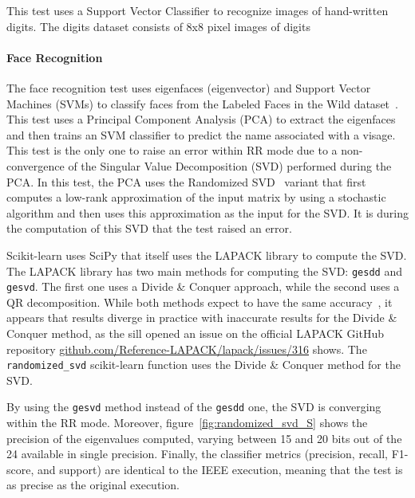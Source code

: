 \documentclass[11pt]{article}
\begin{document}
This test uses a Support Vector Classifier to recognize images of hand-written
digits. The digits dataset consists of 8x8 pixel images of digits


\paragraph{Face Recognition}

The face recognition test uses eigenfaces (eigenvector) and Support Vector Machines (SVMs) to classify faces from the Labeled Faces in the Wild dataset~\cite{LFWTech}. This test uses a Principal Component Analysis (PCA) to extract the eigenfaces and then trains an SVM classifier to predict the name associated with a visage. This test is the only one to raise an error within RR mode due to a non-convergence of the Singular Value Decomposition (SVD) performed during the PCA.
In this test, the PCA uses the Randomized SVD~\cite{halko2011finding} variant that first computes a low-rank approximation of the input matrix by using a stochastic algorithm and then uses this approximation as the input for the SVD. It is during the computation of this SVD that the test raised an error.

Scikit-learn uses SciPy that itself uses the LAPACK library to compute the SVD. The LAPACK library has two main methods for computing the SVD: 
\texttt{gesdd} and \texttt{gesvd}. The first one uses a Divide \& Conquer approach, while the second uses a QR decomposition. While both methods expect to have the same accuracy~\cite{nakatsukasa2013stable}, it appears that results diverge in practice with inaccurate results for the Divide \& Conquer method, as the sill opened an issue on the official LAPACK GitHub repository \href{https://github.com/Reference-LAPACK/lapack/issues/316}{github.com/Reference-LAPACK/lapack/issues/316} shows. The \texttt{randomized\_svd} scikit-learn function uses the Divide \& Conquer method for the SVD. 

By using the \texttt{gesvd} method instead of the \texttt{gesdd} one, the SVD is converging within the RR mode. Moreover, figure~\ref{fig:randomized_svd_S} shows the precision of the eigenvalues computed, varying between 15 and 20 bits out of the 24 available in single precision. Finally, the classifier metrics (precision, recall, F1-score, and support) are identical to the IEEE execution, meaning that the test is as precise as the original execution.
\end{document}
